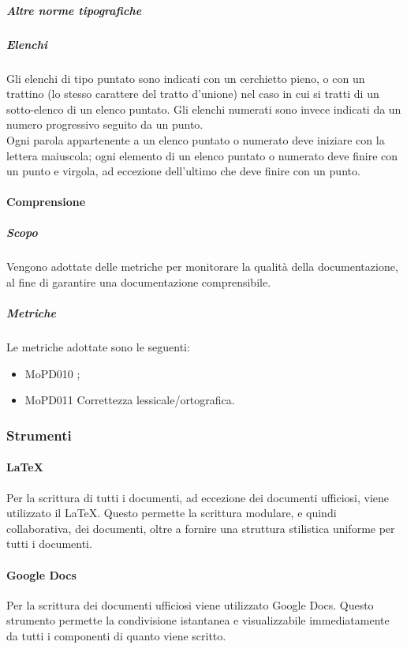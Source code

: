 \documentclass[../norme-di-progetto.tex]{subfiles}
\begin{document}
\subparagraph{Altre norme tipografiche}
\subparagraph*{Elenchi}
Gli elenchi di tipo puntato sono indicati con un cerchietto pieno, o con un trattino (lo stesso carattere del tratto d'unione) nel caso in cui si tratti di un sotto-elenco di un elenco puntato. Gli elenchi numerati sono invece indicati da un numero progressivo seguito da un punto. \\
Ogni parola appartenente a un elenco puntato o numerato deve iniziare con la lettera maiuscola; ogni elemento di un elenco puntato o numerato deve finire con un punto e virgola, ad eccezione dell'ultimo che deve finire con un punto.

\paragraph{Comprensione}
\subparagraph{Scopo}
Vengono adottate delle metriche per monitorare la qualità della documentazione, al fine di garantire una documentazione comprensibile.
\subparagraph{Metriche}
Le metriche adottate sono le seguenti:
\begin{itemize}
  \item MoPD010 ;
  \item MoPD011 Correttezza lessicale/ortografica.
\end{itemize}

\subsubsection{Strumenti}
\paragraph{\LaTeX}
Per la scrittura di tutti i documenti, ad eccezione dei documenti ufficiosi, viene utilizzato il  \LaTeX. Questo permette la scrittura modulare, e quindi collaborativa, dei documenti, oltre a fornire una struttura stilistica uniforme per tutti i documenti.
\paragraph{Google Docs}
Per la scrittura dei documenti ufficiosi viene utilizzato Google Docs. Questo strumento permette la condivisione istantanea e visualizzabile immediatamente da tutti i componenti di quanto viene scritto.
\end{document}
